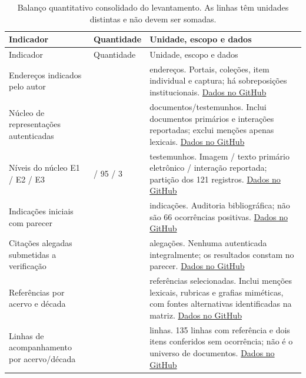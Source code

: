 \small\begin{longtable}{>{\raggedright\arraybackslash}p{}>{\raggedright\arraybackslash}p{}>{\raggedright\arraybackslash}p{}}
\caption{Balanço quantitativo consolidado do levantamento. As linhas têm unidades distintas e não devem ser somadas.}\\
\toprule Indicador & Quantidade & Unidade, escopo e dados\\\midrule\endfirsthead
\toprule Indicador & Quantidade & Unidade, escopo e dados\\\midrule\endhead
Endereços indicados pelo autor & 16 & endereços. Portais, coleções, item individual e captura; há sobreposições institucionais. \href{https://github.com/murilloed/historia-riso-escrito-portugues/blob/main/data/base_registry.csv}{Dados no GitHub} \\
Núcleo de representações autenticadas & 121 & documentos/testemunhos. Inclui documentos primários e interações reportadas; exclui menções apenas lexicais. \href{https://github.com/murilloed/historia-riso-escrito-portugues/blob/main/data/attestations.csv}{Dados no GitHub} \\
Níveis do núcleo E1 / E2 / E3 & 23 / 95 / 3 & testemunhos. Imagem / texto primário eletrônico / interação reportada; partição dos 121 registros. \href{https://github.com/murilloed/historia-riso-escrito-portugues/blob/main/data/attestations.csv}{Dados no GitHub} \\
Indicações iniciais com parecer & 66 & indicações. Auditoria bibliográfica; não são 66 ocorrências positivas. \href{https://github.com/murilloed/historia-riso-escrito-portugues/blob/main/data/references_audit.csv}{Dados no GitHub} \\
Citações alegadas submetidas a verificação & 22 & alegações. Nenhuma autenticada integralmente; os resultados constam no parecer. \href{https://github.com/murilloed/historia-riso-escrito-portugues/blob/main/data/claims_verification.csv}{Dados no GitHub} \\
Referências por acervo e década & 135 & referências selecionadas. Inclui menções lexicais, rubricas e grafias miméticas, com fontes alternativas identificadas na matriz. \href{https://github.com/murilloed/historia-riso-escrito-portugues/blob/main/data/archive_decade_references.csv}{Dados no GitHub} \\
Linhas de acompanhamento por acervo/década & 137 & linhas. 135 linhas com referência e dois itens conferidos sem ocorrência; não é o universo de documentos. \href{https://github.com/murilloed/historia-riso-escrito-portugues/blob/main/data/archive_decade_matrix.csv}{Dados no GitHub} \\

\end{longtable}
